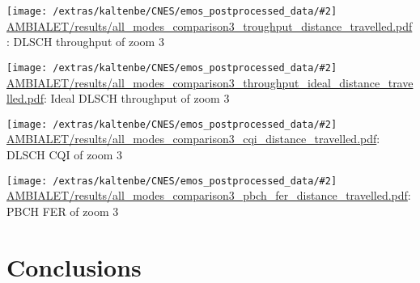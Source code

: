 \documentclass[a4paper,10pt]{article}
\newcommand{\printfile}[2][]{
 \begin{minipage}{8cm}
  \centering
  \texttt{[image: /extras/kaltenbe/CNES/emos\_postprocessed\_data/\#2]}
  \url{#2}: #1

 \end{minipage}
}
\begin{document}
\printfile[DLSCH throughput of zoom 3]{AMBIALET/results/all_modes_comparison3_troughput_distance_travelled.pdf}
\printfile[Ideal DLSCH throughput of zoom 3]{AMBIALET/results/all_modes_comparison3_throughput_ideal_distance_travelled.pdf}

\printfile[DLSCH CQI of zoom 3]{AMBIALET/results/all_modes_comparison3_cqi_distance_travelled.pdf}
\printfile[PBCH FER of zoom 3]{AMBIALET/results/all_modes_comparison3_pbch_fer_distance_travelled.pdf}


\section{Conclusions}


 

\end{document}
